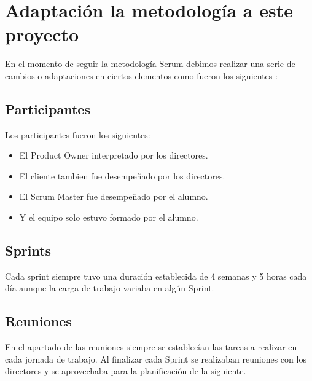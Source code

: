 \section{Adaptación la metodología a este proyecto }
 En el momento de seguir la metodología Scrum debimos realizar una serie de cambios o adaptaciones en ciertos elementos como fueron los siguientes :
\subsection{Participantes}
Los participantes fueron los siguientes:
\begin{itemize}
\item El Product Owner interpretado por los  directores.
\item El cliente tambien fue desempeñado por los directores.
\item El Scrum Master fue desempeñado por el alumno.
\item  Y el equipo solo estuvo formado por el alumno.

\end{itemize}

\subsection{Sprints}
Cada sprint siempre tuvo una duración establecida de 4 semanas y 5 horas cada día aunque la carga de trabajo variaba en algún Sprint.


\subsection{Reuniones}

En el apartado de las reuniones siempre se establecían las tareas a realizar en cada jornada de trabajo. Al finalizar cada Sprint se realizaban reuniones con los directores y se aprovechaba para la planificación de la siguiente.
